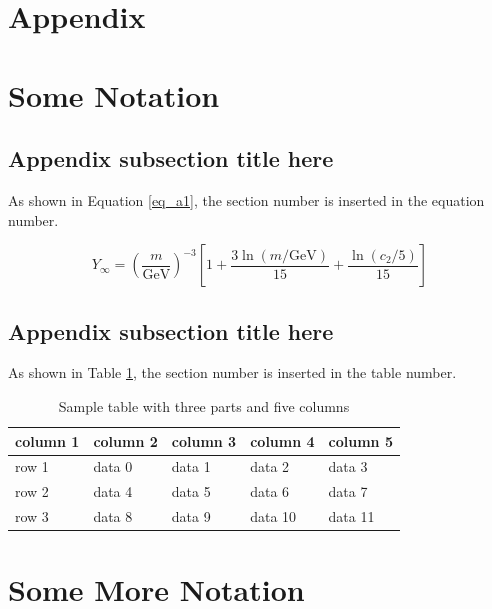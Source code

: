 \documentclass[12pt,a4paper]{article}
\begin{document}
\begin{appendices}

\section*{Appendix}
\section{Some Notation}
\lipsum[10]

\subsection{Appendix subsection title here}
As shown in Equation \ref{eq_a1}, the section number is inserted in the equation number.
\lipsum[11]

\begin{equation}
Y_\infty = \left( \frac{m}{\textrm{GeV}} \right)^{-3}
    \left[ 1 + \frac{3 \ln(m/\textrm{GeV})}{15}
    + \frac{\ln(c_2/5)}{15} \right]
\label{eq_a1}
\end{equation}

\subsection{Appendix subsection  title here}
As shown in Table \ref{tab_a1}, the section number is inserted in the table number.
\lipsum[12]

\begin{table}[!ht]
\caption{Sample table with three parts and five columns\label{tab_a1}}
\begin{threeparttable}
\begin{tabular*}{\columnwidth}{@{\extracolsep\fill}lllll@{\extracolsep\fill}}
\toprule
column 1 & column 2 & column 3 & column 4 & column 5\\
\midrule
row 1 & data 0 & data 1 & data 2 & data 3 \\
row 2 & data 4 & data 5 & data 6 & data 7 \\
row 3 & data 8 & data 9 & data 10 & data 11\\
\bottomrule
\end{tabular*}
\end{threeparttable}
\end{table}

\section{Some More Notation}


\end{appendices}
\end{document}

